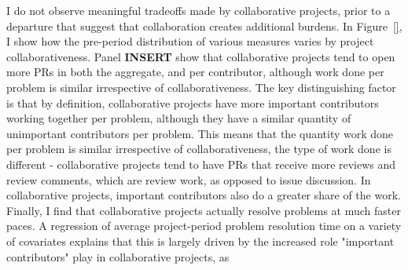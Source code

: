 \documentclass[12pt,notitlepage]{article}
\begin{document}
I do not observe meaningful tradeoffs made by collaborative projects, prior to a departure that suggest that collaboration creates additional burdens. 
In Figure~\ref{}, I show how the pre-period distribution of various measures varies by project collaborativeness. 
Panel \textbf{INSERT} show that collaborative projects tend to open more PRs in both the aggregate, and per contributor, although work done per problem is similar irrespective of collaborativeness. The key distinguishing factor is that by definition, collaborative projects have more important contributors working together per problem, although they have a similar quantity of unimportant contributors per problem. This means that the quantity work done per problem is similar irrespective of collaborativeness, the type of work done is different - collaborative projects tend to have PRs that receive more reviews and review comments, which are review work, as opposed to issue discussion. In collaborative projects, important contributors also do a greater share of the work. Finally, I find that collaborative projects actually resolve problems at much faster paces. A regression of average project-period problem resolution time on a variety of covariates explains that this is largely driven by the increased role "important contributors" play in collaborative projects, as 



\end{document}
